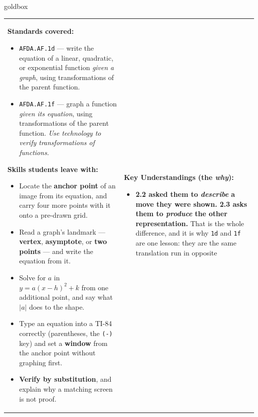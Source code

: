 \documentclass[10pt]{article}
\begin{document}
\renewcommand{\arraystretch}{1.6}
\begin{skillbox}{goldbox}
\begin{tabularx}{\linewidth}{@{}X|X@{}}
\begin{minipage}[t]{\linewidth}\vspace{0pt}
\textbf{Standards covered:}
\begin{itemize}[leftmargin=1.1em, itemsep=2pt, topsep=2pt]
  \item \texttt{AFDA.AF.1d} --- write the equation of a linear, quadratic, or exponential function
        \emph{given a graph}, using transformations of the parent function.
  \item \texttt{AFDA.AF.1f} --- graph a function \emph{given its equation}, using transformations of
        the parent function. \emph{Use technology to verify transformations of functions.}
\end{itemize}
\textbf{Skills students leave with:}
\begin{itemize}[leftmargin=1.1em, itemsep=2pt, topsep=2pt]
  \item Locate the \textbf{anchor point} of an image from its equation, and carry four more points
        with it onto a pre-drawn grid.
  \item Read a graph's landmark --- \textbf{vertex}, \textbf{asymptote}, or \textbf{two points} ---
        and write the equation from it.
  \item Solve for $a$ in $y=a(x-h)^2+k$ from one additional point, and say what $|a|$ does to the
        shape.
  \item Type an equation into a TI-84 correctly (parentheses, the \texttt{(-)} key) and set a
        \textbf{window} from the anchor point without graphing first.
  \item \textbf{Verify by substitution}, and explain why a matching screen is not proof.
\end{itemize}
\end{minipage}
&
\begin{minipage}[t]{\linewidth}\vspace{0pt}
\textbf{Key Understandings (the \emph{why}):}
\begin{itemize}[leftmargin=1.1em, itemsep=2pt, topsep=2pt]
  \item \textbf{2.2 asked them to \emph{describe} a move they were shown. 2.3 asks them to
        \emph{produce} the other representation.} That is the whole difference, and it is why
        \texttt{1d} and \texttt{1f} are one lesson: they are the same translation run in opposite

\end{itemize}
\end{minipage}
\end{tabularx}
\end{skillbox}
\end{document}
